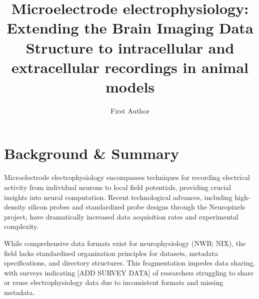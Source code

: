 \documentclass[fleqn,10pt]{wlscirep}
\title{Microelectrode electrophysiology: Extending the Brain Imaging Data Structure to intracellular and extracellular recordings in animal models}
\author[1,*]{First Author}
\begin{document}
\flushbottom
\maketitle

\thispagestyle{empty}


\section*{Background \& Summary}



Microelectrode electrophysiology encompasses techniques for recording electrical activity from individual neurons to local field potentials, providing crucial insights into neural computation.
Recent technological advances, including high-density silicon probes and standardized probe designs through the Neuropixels project, have dramatically increased data acquisition rates and experimental complexity.

While comprehensive data formats exist for neurophysiology (NWB; NIX),
the field lacks standardized organization principles for datasets, metadata specifications, and directory structures.
This fragmentation impedes data sharing, with surveys indicating [ADD SURVEY DATA] of researchers struggling to share or reuse electrophysiology data due to inconsistent formats and missing metadata.
\end{document}
